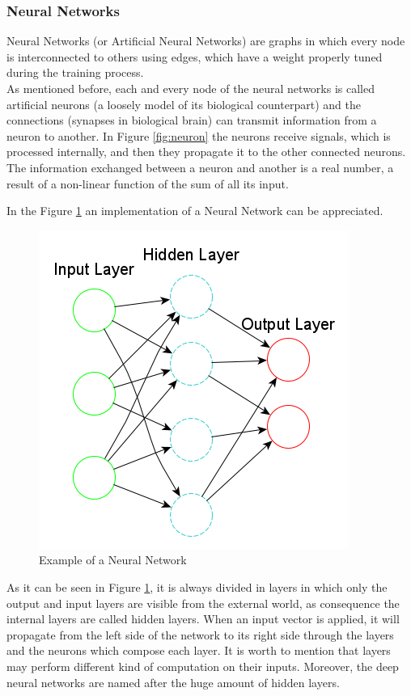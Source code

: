 \subsubsection{Neural Networks}

Neural Networks (or Artificial Neural Networks) are graphs in which every node is interconnected to others using edges, which have a weight properly tuned during the training process.\\
As mentioned before, each and every node of the neural networks is called artificial neurons (a loosely model of its biological counterpart) and the connections (synapses in biological brain) can transmit information from a neuron to another. In Figure \ref{fig:neuron} the neurons receive signals, which is processed internally, and then they propagate it to the other connected neurons.\\
The information exchanged between a neuron and another is a real number, a result of a non-linear function of the sum of all its input.

In the Figure \ref{fig:nn} an implementation of a Neural Network can be appreciated.
\begin{figure}[H]
\centering
\captionsetup{justification=centering}
\includegraphics[scale=0.55]{./figure/neural_network.png}
\caption{Example of a Neural Network}
\label{fig:nn}
\end{figure}
As it can be seen in Figure \ref{fig:nn}, it is always divided in layers in which only the output and input layers are visible from the external world, as consequence the internal layers are called hidden layers. When an input vector is applied, it will propagate from the left side of the network to its right side through the layers and the neurons which compose each layer. It is worth to mention that layers may perform different kind of computation on their inputs. Moreover, the deep neural networks are named after the huge amount of hidden layers.\\\\

